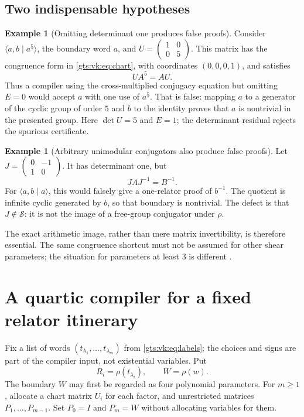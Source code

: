 \documentclass[11pt,letterpaper]{article}
\theoremstyle{definition}
\newtheorem{example}[theorem]{Example}
\theoremstyle{remark}
\newcommand{\San}{\mathcal S}
\newcommand{\smallmat}[4]{\begin{pmatrix}#1&#2\\#3&#4\end{pmatrix}}
\begin{document}
\subsection{Two indispensable hypotheses}

\begin{example}[Omitting determinant one produces false proofs]\label{gts:vk:ex:det}
Consider $\langle a,b\mid a^5\rangle$, the boundary word $a$, and
$U=\smallmat{1}{0}{0}{5}$. This matrix has the congruence form in
\eqref{gts:vk:eq:chart}, with coordinates $(0,0,0,1)$, and satisfies
\[
 U A^5=A U.
\]
Thus a compiler using the cross-multiplied conjugacy equation but omitting $E=0$ would accept $a$ with one use of $a^5$. That is false: mapping $a$ to a generator of the cyclic group of order $5$ and $b$ to the identity proves that $a$ is nontrivial in the presented group. Here $\det U=5$ and $E=1$; the determinant residual rejects the spurious certificate.
\end{example}

\begin{example}[Arbitrary unimodular conjugators also produce false proofs]\label{gts:vk:ex:congruence}
Let $J=\smallmat{0}{-1}{1}{0}$. It has determinant one, but
\[
 JAJ^{-1}=B^{-1}.
\]
For $\langle a,b\mid a\rangle$, this would falsely give a one-relator proof of $b^{-1}$. The quotient is infinite cyclic generated by $b$, so that boundary is nontrivial. The defect is that $J\notin\San$: it is not the image of a free-group conjugator under $\rho$.
\end{example}

The exact arithmetic image, rather than mere matrix invertibility, is therefore essential. The same congruence shortcut must not be assumed for other shear parameters; the situation for parameters at least $3$ is different \cite[Theorem~3]{chorna}.

\section{A quartic compiler for a fixed relator itinerary}\label{gts:vk:sec:itinerary}

Fix a list of words $(t_{\lambda_1},\ldots,t_{\lambda_m})$ from
\eqref{gts:vk:eq:labels}; the choices and signs are part of the compiler input, not existential variables. Put
\[
 R_i=\rho(t_{\lambda_i}),\qquad W=\rho(w).
\]
The boundary $W$ may first be regarded as four polynomial parameters. For $m\geq1$, allocate a chart matrix $U_i$ for each factor, and unrestricted matrices $P_1,\ldots,P_{m-1}$. Set $P_0=I$ and $P_m=W$ without allocating variables for them.
\end{document}
